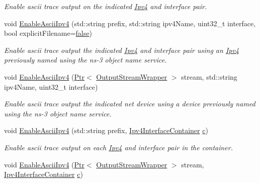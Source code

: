 \begin{DoxyCompactItemize}
\begin{DoxyCompactList}\small\item\em Enable ascii trace output on the indicated \hyperlink{classns3_1_1Ipv4}{Ipv4} and interface pair. \end{DoxyCompactList}\item 
void \hyperlink{classns3_1_1AsciiTraceHelperForIpv4_ae7359f4004aa13cc0685a3b6cc975366}{Enable\+Ascii\+Ipv4} (std\+::string prefix, std\+::string ipv4\+Name, uint32\+\_\+t interface, bool explicit\+Filename=\hyperlink{lte__cqi__generation_8m_ab1bef239d413c4da139c4bac92cd657a}{false})
\begin{DoxyCompactList}\small\item\em Enable ascii trace output the indicated \hyperlink{classns3_1_1Ipv4}{Ipv4} and interface pair using an \hyperlink{classns3_1_1Ipv4}{Ipv4} previously named using the ns-\/3 object name service. \end{DoxyCompactList}\item 
void \hyperlink{classns3_1_1AsciiTraceHelperForIpv4_a0f04345684821de15733cb6de9099d37}{Enable\+Ascii\+Ipv4} (\hyperlink{classns3_1_1Ptr}{Ptr}$<$ \hyperlink{classns3_1_1OutputStreamWrapper}{Output\+Stream\+Wrapper} $>$ stream, std\+::string ipv4\+Name, uint32\+\_\+t interface)
\begin{DoxyCompactList}\small\item\em Enable ascii trace output the indicated net device using a device previously named using the ns-\/3 object name service. \end{DoxyCompactList}\item 
void \hyperlink{classns3_1_1AsciiTraceHelperForIpv4_a20ffbcd7941c6b1c8b54aaf26f73c73b}{Enable\+Ascii\+Ipv4} (std\+::string prefix, \hyperlink{classns3_1_1Ipv4InterfaceContainer}{Ipv4\+Interface\+Container} \hyperlink{mmwave_2model_2fading-traces_2fading__trace__generator_8m_ae0323a9039add2978bf5b49550572c7c}{c})
\begin{DoxyCompactList}\small\item\em Enable ascii trace output on each \hyperlink{classns3_1_1Ipv4}{Ipv4} and interface pair in the container. \end{DoxyCompactList}\item 
void \hyperlink{classns3_1_1AsciiTraceHelperForIpv4_a5045013a2f48ef6e253368dbe896069c}{Enable\+Ascii\+Ipv4} (\hyperlink{classns3_1_1Ptr}{Ptr}$<$ \hyperlink{classns3_1_1OutputStreamWrapper}{Output\+Stream\+Wrapper} $>$ stream, \hyperlink{classns3_1_1Ipv4InterfaceContainer}{Ipv4\+Interface\+Container} \hyperlink{mmwave_2model_2fading-traces_2fading__trace__generator_8m_ae0323a9039add2978bf5b49550572c7c}{c})

\end{DoxyCompactItemize}
